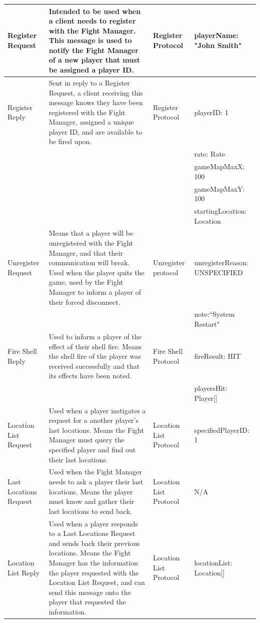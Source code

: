 \documentclass[12pt]{article}
\begin{document}
			\begin{supertabular}{|p{2cm}|p{5cm}|p{3cm}|p{4cm}|}
				Register Request & Intended to be used when a client needs to register with the Fight Manager. This message is used to notify the Fight Manager of a new player that must be assigned a player ID. & Register Protocol & playerName: "John Smith" \\ \hline
				Register Reply & Sent in reply to a Register Request, a client receiving this message knows they have been registered with the Fight Manager, assigned a unique player ID, and are available to be fired upon. & Register Protocol & playerID: 1 \\&&& rate: Rate \\&&& gameMapMaxX: 100 \\&&& gameMapMaxY: 100 \\&&& startingLocation: Location \\ \hline
				
				Unregister Request & Means that a player will be unregistered with the Fight Manager, and that their communication will break. Used when the player quits the game, used by the Fight Manager to inform a player of their forced disconnect. & Unregister protocol & unregisterReason: UNSPECIFIED \\ &&&note:``System Restart" \\ \hline
				
				Fire Shell Reply & Used to inform a player of the effect of their shell fire. Means the shell fire of the player was received successfully and that its effects have been noted. & Fire Shell Protocol & fireResult: HIT \\&&&playersHit: Player[]\\ \hline
				
				Location List Request& Used when a player instigates a request for a another player's last locations. Means the Fight Manager must query the specified player and find out their last locations.& Location List Protocol&specifiedPlayerID: 1\\ \hline
				Last Locations Request&Used when the Fight Manager needs to ask a player their last locations. Means the player must know and gather their last locations to send back.&Location List Protocol&N/A\\ \hline
				Location List Reply&Used when a player responds to a Last Locations Request and sends back their previous locations. Means the Fight Manager has the information the player requested with the Location List Request, and can send this message onto the player that requested the information.&Location List Protocol&locationList: Location[]\\ \hline
				

\end{supertabular}
\end{document}
